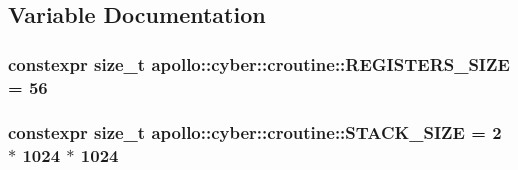 \subsection{Variable Documentation}
\hypertarget{namespaceapollo_1_1cyber_1_1croutine_aa975ad5018ccbbb80b0cac19c50dc39f}{
\subsubsection[{R\-E\-G\-I\-S\-T\-E\-R\-S\-\_\-\-S\-I\-Z\-E}]{\setlength{\rightskip}{0pt plus 5cm}constexpr size\-\_\-t apollo\-::cyber\-::croutine\-::\-R\-E\-G\-I\-S\-T\-E\-R\-S\-\_\-\-S\-I\-Z\-E = 56}}\label{namespaceapollo_1_1cyber_1_1croutine_aa975ad5018ccbbb80b0cac19c50dc39f}
\hypertarget{namespaceapollo_1_1cyber_1_1croutine_ac645ea6350d95f21980e311868f72557}{
\subsubsection[{S\-T\-A\-C\-K\-\_\-\-S\-I\-Z\-E}]{\setlength{\rightskip}{0pt plus 5cm}constexpr size\-\_\-t apollo\-::cyber\-::croutine\-::\-S\-T\-A\-C\-K\-\_\-\-S\-I\-Z\-E = 2 $\ast$ 1024 $\ast$ 1024}}\label{namespaceapollo_1_1cyber_1_1croutine_ac645ea6350d95f21980e311868f72557}
